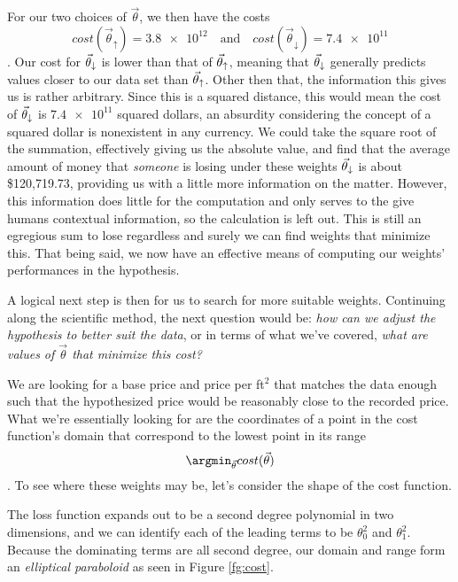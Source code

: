 For our two choices of $\vec\theta$, we then have the costs
\begin{equation}\label{eq:tud cost results}
    cost(\vec\theta_{\uparrow})= \num{3.8e12} \quad \text{and} \quad
    cost(\vec\theta_{\downarrow}) = \num{7.4e11}
\end{equation}
. Our cost for $\vec\theta_{\downarrow}$ is lower than that of $\vec\theta_{\uparrow}$, meaning that $\vec\theta_{\downarrow}$ generally
predicts values closer to our data set than $\vec\theta_{\uparrow}$. Other then that, the
information this gives us is rather arbitrary. Since this is a squared distance,
this would mean the cost of $\vec\theta_{\downarrow}$ is $\num{7.4e11}$ squared dollars, an
absurdity considering the concept of a squared dollar is nonexistent in any
currency.  We could take the square root of the summation, effectively giving us the absolute value, and find that the average
amount of money that \emph{someone} is losing under these weights $\vec\theta_{\downarrow}$ is about
\$120,719.73, providing us with a little more information on the matter.
However, this information does little for the computation and only serves to the
give humans contextual information, so the calculation is left out. This is
still an egregious sum to lose regardless and surely we can find weights that minimize
this. That being said, we now have an effective means of computing our weights'
performances in the hypothesis.

A logical next step is then for us to search for more suitable weights. Continuing along
the scientific method, the next question would be: \emph{how can we adjust the
hypothesis to better suit the data}, or in terms of what we've covered,
\emph{what are values of $\vec\theta$ that minimize this cost?}

We are looking for a base price and price per ft$^2$ that matches the data
enough such that the hypothesized price would be reasonably close to the
recorded price. What we're essentially looking for are the coordinates of a
point in the cost function's domain that correspond to the 	lowest point in its range
\begin{equation}
    \argmin_{\vec\theta} cost(\vec\theta)
\end{equation}
. To see where these weights may be, let's consider the shape of the cost function.

The loss function expands out to be a second degree polynomial in two
dimensions, and we can identify each of the leading terms to be $\theta_0^2$ and
$\theta_1^2$. Because the dominating terms are all second degree, our domain and
range form an \emph{elliptical paraboloid} as seen in Figure \ref{fg:cost}. 

